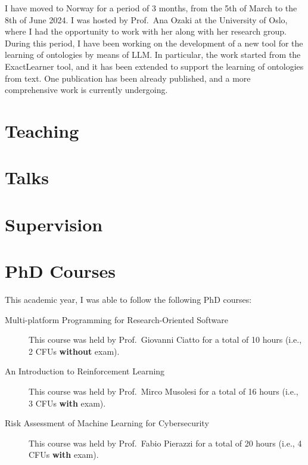 \documentclass[
]{ceurart}
\begin{document}
I have moved to Norway for a period of 3 months, from the 5th of March to the 8th of June 2024.
%
I was hosted by Prof.~Ana Ozaki at the University of Oslo, where I had the opportunity to work with her along with her research group.
%
During this period, I have been working on the development of a new tool for the learning of ontologies by means of \ac{LLM}.
%
In particular, the work started from the ExactLearner tool, and it has been extended to support the learning of ontologies from text.
%
One publication has been already published, and a more comprehensive work is currently undergoing.

\section{Teaching}
\label{sec:results}

\section{Talks}
\label{sec:talks}

\section{Supervision}
\label{sec:supervision}

\section{PhD Courses}
\label{sec:phd-courses}

This academic year, I was able to follow the following PhD courses:
\begin{description}
    \item[Multi-platform Programming for Research-Oriented Software] This course was held by Prof.~Giovanni Ciatto for a total of 10 hours (i.e., 2 CFUs \textbf{without} exam).
    \item[An Introduction to Reinforcement Learning] This course was held by Prof.~Mirco Musolesi for a total of 16 hours (i.e., 3 CFUs \textbf{with} exam).
    \item[Risk Assessment of Machine Learning for Cybersecurity] This course was held by Prof.~Fabio Pierazzi for a total of 20 hours (i.e., 4 CFUs \textbf{with} exam).
\end{description}
\end{document}
